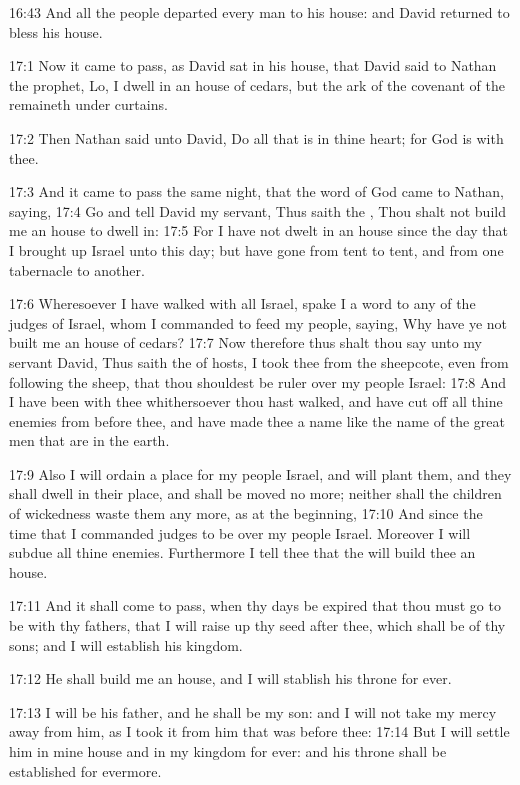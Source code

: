 16:43 And all the people departed every man to his house: and David
returned to bless his house.

17:1 Now it came to pass, as David sat in his house, that David said
to Nathan the prophet, Lo, I dwell in an house of cedars, but the ark
of the covenant of the \LORD remaineth under curtains.

17:2 Then Nathan said unto David, Do all that is in thine heart; for
God is with thee.

17:3 And it came to pass the same night, that the word of God came to
Nathan, saying, 17:4 Go and tell David my servant, Thus saith the
\LORD, Thou shalt not build me an house to dwell in: 17:5 For I have
not dwelt in an house since the day that I brought up Israel unto this
day; but have gone from tent to tent, and from one tabernacle to
another.

17:6 Wheresoever I have walked with all Israel, spake I a word to any
of the judges of Israel, whom I commanded to feed my people, saying,
Why have ye not built me an house of cedars?  17:7 Now therefore thus
shalt thou say unto my servant David, Thus saith the \LORD of hosts, I
took thee from the sheepcote, even from following the sheep, that thou
shouldest be ruler over my people Israel: 17:8 And I have been with
thee whithersoever thou hast walked, and have cut off all thine
enemies from before thee, and have made thee a name like the name of
the great men that are in the earth.

17:9 Also I will ordain a place for my people Israel, and will plant
them, and they shall dwell in their place, and shall be moved no more;
neither shall the children of wickedness waste them any more, as at
the beginning, 17:10 And since the time that I commanded judges to be
over my people Israel. Moreover I will subdue all thine enemies.
Furthermore I tell thee that the \LORD will build thee an house.

17:11 And it shall come to pass, when thy days be expired that thou
must go to be with thy fathers, that I will raise up thy seed after
thee, which shall be of thy sons; and I will establish his kingdom.

17:12 He shall build me an house, and I will stablish his throne for
ever.

17:13 I will be his father, and he shall be my son: and I will not
take my mercy away from him, as I took it from him that was before
thee: 17:14 But I will settle him in mine house and in my kingdom for
ever: and his throne shall be established for evermore.

